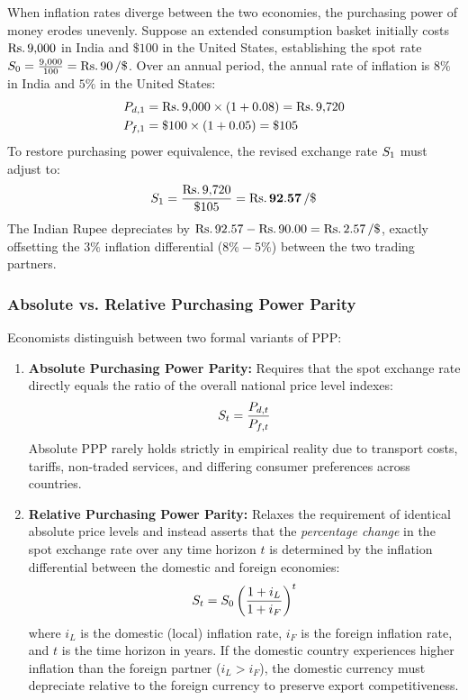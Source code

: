 When inflation rates diverge between the two economies, the purchasing power of money erodes unevenly. Suppose an extended consumption basket initially costs $\text{Rs.}\, 9{,}000$ in India and $\$100$ in the United States, establishing the spot rate $\Spot_0 = \frac{9{,}000}{100} = \inr 90\,/\$$. Over an annual period, the annual rate of inflation is $8\%$ in India and $5\%$ in the United States:
\begin{align*}
    P_{d, 1} &= \text{Rs.}\, 9{,}000 \times (1 + 0.08) = \text{Rs.}\, 9{,}720 \\
    P_{f, 1} &= \$100 \times (1 + 0.05) = \$105
\end{align*}
To restore purchasing power equivalence, the revised exchange rate $S_1$ must adjust to:
\begin{equation*}
    S_1 = \frac{\text{Rs.}\, 9{,}720}{\$105} = \mathbf{\text{Rs.}\, 92.57\,/\$}
\end{equation*}
The Indian Rupee depreciates by $\inr 92.57 - \inr 90.00 = \inr 2.57\,/\$$, exactly offsetting the $3\%$ inflation differential ($8\% - 5\%$) between the two trading partners.

\subsubsection{Absolute vs. Relative Purchasing Power Parity}
Economists distinguish between two formal variants of PPP:
\begin{enumerate}[leftmargin=*, label=\arabic*.]
    \item \textbf{Absolute Purchasing Power Parity:} Requires that the spot exchange rate directly equals the ratio of the overall national price level indexes:
    \begin{equation}
        S_t = \frac{P_{d, t}}{P_{f, t}}
    \end{equation}
    Absolute PPP rarely holds strictly in empirical reality due to transport costs, tariffs, non-traded services, and differing consumer preferences across countries.
    \item \textbf{Relative Purchasing Power Parity:} Relaxes the requirement of identical absolute price levels and instead asserts that the \textit{percentage change} in the spot exchange rate over any time horizon $t$ is determined by the inflation differential between the domestic and foreign economies:
    \begin{equation}
        S_t = S_0 \left( \frac{1 + i_L}{1 + i_F} \right)^t
    \end{equation}
    where $i_L$ is the domestic (local) inflation rate, $i_F$ is the foreign inflation rate, and $t$ is the time horizon in years. If the domestic country experiences higher inflation than the foreign partner ($i_L > i_F$), the domestic currency must depreciate relative to the foreign currency to preserve export competitiveness.
\end{enumerate}

